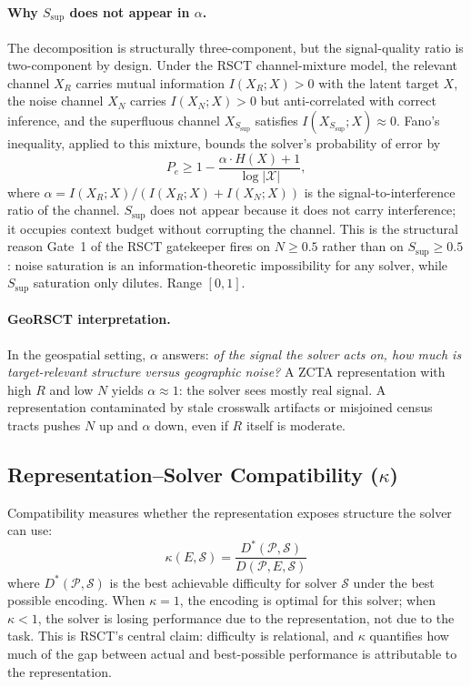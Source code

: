 \documentclass{article}
\begin{document}
\paragraph{Why $S_{\text{sup}}$ does not appear in $\alpha$.} The decomposition is structurally three-component, but the signal-quality ratio is two-component by design. Under the RSCT channel-mixture model, the relevant channel $X_R$ carries mutual information $I(X_R; X) > 0$ with the latent target $X$, the noise channel $X_N$ carries $I(X_N; X) > 0$ but anti-correlated with correct inference, and the superfluous channel $X_{S_{\text{sup}}}$ satisfies $I(X_{S_{\text{sup}}}; X) \approx 0$. Fano's inequality, applied to this mixture, bounds the solver's probability of error by
\begin{equation}
P_e \geq 1 - \frac{\alpha \cdot H(X) + 1}{\log |\mathcal{X}|},
\end{equation}
where $\alpha = I(X_R; X) / (I(X_R; X) + I(X_N; X))$ is the signal-to-interference ratio of the channel. $S_{\text{sup}}$ does not appear because it does not carry interference; it occupies context budget without corrupting the channel. This is the structural reason Gate~1 of the RSCT gatekeeper fires on $N \geq 0.5$ rather than on $S_{\text{sup}} \geq 0.5$: noise saturation is an information-theoretic impossibility for any solver, while $S_{\text{sup}}$ saturation only dilutes. Range $[0,1]$.

\paragraph{GeoRSCT interpretation.} In the geospatial setting, $\alpha$ answers: \emph{of the signal the solver acts on, how much is target-relevant structure versus geographic noise?} A ZCTA representation with high $R$ and low $N$ yields $\alpha \approx 1$: the solver sees mostly real signal. A representation contaminated by stale crosswalk artifacts or misjoined census tracts pushes $N$ up and $\alpha$ down, even if $R$ itself is moderate.

\subsection{\texorpdfstring{Representation--Solver Compatibility ($\kappa$)}{Representation-Solver Compatibility (kappa)}}

Compatibility measures whether the representation exposes structure the solver can use:
\begin{equation}
\kappa(E,\mathcal{S}) = \frac{D^*(\mathcal{P},\mathcal{S})}{D(\mathcal{P},E,\mathcal{S})}
\end{equation}
where $D^*(\mathcal{P},\mathcal{S})$ is the best achievable difficulty for solver $\mathcal{S}$ under the best possible encoding. When $\kappa = 1$, the encoding is optimal for this solver; when $\kappa < 1$, the solver is losing performance due to the representation, not due to the task. This is RSCT's central claim: difficulty is relational, and $\kappa$ quantifies how much of the gap between actual and best-possible performance is attributable to the representation.
\end{document}
